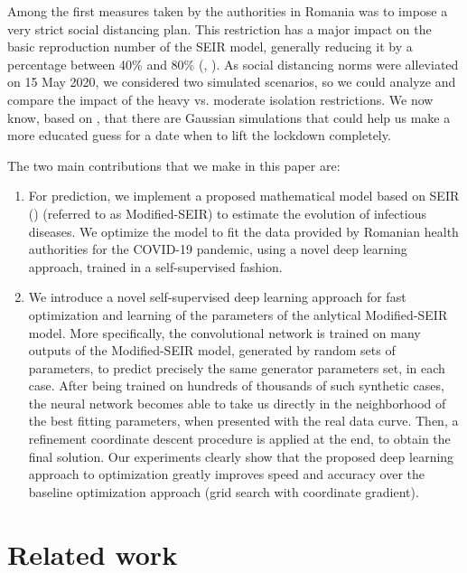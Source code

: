 \documentclass[11pt]{article}
\begin{document}
Among the first measures taken by the authorities in Romania was to impose a very strict social distancing plan. This restriction has a major impact on the basic reproduction number of the SEIR model, generally reducing it by a percentage between 40\% and 80\% (\cite{socialDistancing}, \cite{Read2020.01.23.20018549}). As social distancing norms were alleviated on 15 May 2020, we considered two simulated scenarios, so we could analyze and compare the impact of the heavy vs. moderate isolation restrictions. We now know, based on \cite{when-to-lift}, that there are Gaussian simulations that could help us make a more educated guess for a date when to lift the lockdown completely.

The two main contributions that we make in this paper are:

\begin{enumerate}
    \item For prediction, we implement a proposed mathematical model based on SEIR (\cite{chowdhury2020dynamic, gabgoh}) (referred to as Modified-SEIR) to estimate the evolution of infectious diseases. We optimize the model to fit the data provided by Romanian health authorities for the COVID-19 pandemic, using a novel deep learning approach, trained in a self-supervised fashion.
    
    \item We introduce a novel self-supervised deep learning approach for fast optimization and learning of the parameters of the anlytical Modified-SEIR model. More specifically, the convolutional network is trained on many outputs of the Modified-SEIR model, generated by random sets of parameters, to predict precisely the same generator parameters set, in each case. After being trained on hundreds of thousands of such synthetic cases, the neural network becomes able to take us directly in the neighborhood of the best fitting parameters, when presented with the real data curve. Then, a refinement coordinate descent procedure is applied at the end, to obtain the final solution. Our experiments clearly show that the proposed deep learning approach to optimization greatly improves speed and accuracy over the baseline optimization approach (grid search with coordinate gradient).
\end{enumerate}

\section{Related work} \label{related-work}
\end{document}
